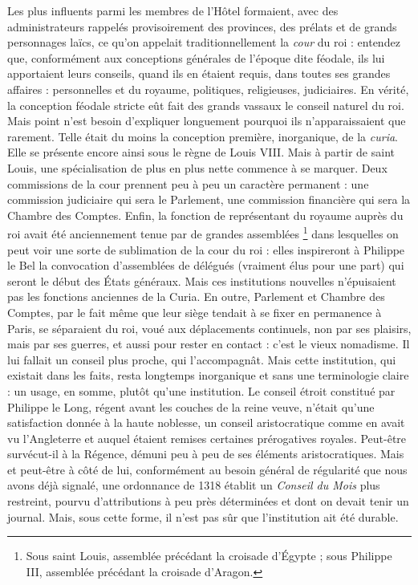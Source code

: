 \documentclass[french,twoside]{book} %
\begin{document}
Les plus influents parmi les membres de l’Hôtel formaient, avec des administrateurs rappelés provisoirement des provinces, des prélats et de grands personnages laïcs, ce qu’on appelait traditionnellement la \emph{cour} du roi : entendez que, conformément aux conceptions générales de l’époque dite féodale, ils lui apportaient leurs conseils, quand ils en étaient requis, dans toutes ses grandes affaires : personnelles et du royaume, politiques, religieuses, judiciaires. En vérité, la conception féodale stricte eût fait des grands vassaux le conseil naturel du roi. Mais point n’est besoin d’expliquer longuement pourquoi ils n’apparaissaient que rarement. Telle était du moins la conception première, inorganique, de la {\itshape curia}. Elle se présente encore ainsi sous le règne de Louis VIII. Mais à partir de saint Louis, une spécialisation de plus en plus nette commence à se marquer. Deux commissions de la cour prennent peu à peu un caractère permanent : une commission judiciaire qui sera le Parlement, une commission financière qui sera la Chambre des Comptes. Enfin, la fonction de représentant du royaume auprès du roi avait été anciennement tenue par de grandes assemblées \footnote{Sous saint Louis, assemblée précédant la croisade d’Égypte ; sous Philippe III, assemblée précédant la croisade d’Aragon.} dans lesquelles on peut voir une sorte de sublimation de la cour du roi : elles inspireront à Philippe le Bel la convocation d’assemblées de délégués (vraiment élus pour une part) qui seront le début des États généraux. Mais ces institutions nouvelles n’épuisaient pas les fonctions anciennes de la Curia. En outre, Parlement et Chambre des Comptes, par le fait même que leur siège tendait à se fixer en permanence à Paris, se séparaient du roi, voué aux déplacements continuels, non par ses plaisirs, mais par ses guerres, et aussi pour rester en contact : c’est le vieux nomadisme. Il lui fallait un conseil plus proche, qui l’accompagnât. Mais cette institution, qui existait dans les faits, resta longtemps inorganique et sans une terminologie claire : un usage, en somme, plutôt qu’une institution. Le conseil étroit constitué par Philippe le Long, régent avant les couches de la reine veuve, n’était qu’une satisfaction donnée à la haute noblesse, un conseil aristocratique comme en avait vu l’Angleterre et auquel étaient remises certaines prérogatives royales. Peut-être survécut-il à la Régence, démuni peu à peu de ses éléments aristocratiques. Mais et peut-être à côté de lui, conformément au besoin général de régularité que nous avons déjà signalé, une ordonnance de 1318 établit un \emph{Conseil du Mois} plus restreint, pourvu d’attributions à peu près déterminées et dont on devait tenir un journal. Mais, sous cette forme, il n’est pas sûr que l’institution ait été durable.
\end{document}
